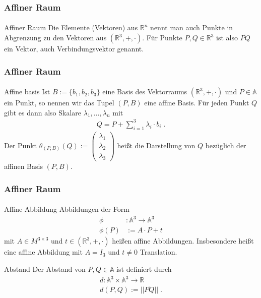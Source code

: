 \documentclass{beamer}
\begin{document}
\begin{frame}
    \frametitle{Affiner Raum}
\framesubtitle{}
\begin{block}{Affiner Raum}
Die Elemente (Vektoren) aus $\mathbb{R}^n$ nennt man auch  Punkte in Abgrenzung zu den Vektoren aus $(\mathbb{R}^3, + , \cdot )$.  
Für Punkte $P,Q \in \mathbb{R}^3$ ist also $\overline{PQ}$ ein Vektor, auch Verbindungsvektor genannt.
\end{block}

\end{frame}


\begin{frame}
    \frametitle{Affiner Raum}
\framesubtitle{}
\begin{block}{Affine basis}
Ist $B:= \{b_1, b_2 , b_3 \}$ eine Basis des Vektorraums  $(\mathbb{R}^3, + , \cdot )$ und $P \in \mathbb{A}$ ein Punkt, so nennen wir das Tupel
$(P, B)$ eine affine Basis. Für jeden Punkt $Q$ gibt es dann also Skalare $\lambda_1,\hdots ,\lambda_n$ mit 
\begin{align*}
Q = P + \sum_{i=1}^{3} \lambda_i \cdot b_i  \; .
\end{align*}
Der Punkt $\theta_{(P,B)}(Q):= \begin{pmatrix}  \lambda_1 \\   \lambda_2 \\  \lambda_3 \end{pmatrix}$ heißt die Darstellung von $Q$ bezüglich der affinen Basis $(P,B)$. 
\end{block}

\end{frame}



\begin{frame}
    \frametitle{Affiner Raum}
\framesubtitle{}
\begin{block}{Affine Abbildung}
Abbildungen der Form
\begin{align*}
\phi &: \mathbb{A}^3 \to \mathbb{A}^3 \\
\phi(P) & := A \cdot P + t
\end{align*} 
mit $A \in M^{3 \times 3}$ und $t \in (\mathbb{R}^3, + , \cdot )$ heißen affine Abbildungen.
Insbesondere heißt eine affine Abbildung mit $A = I_3$ und $t \neq 0$ Translation.
\end{block}
\begin{block}{Abstand}
Der Abstand von  $P,Q \in \mathbb{A}$  ist definiert durch
\begin{align*}
d : \mathbb{A}^3 \times \mathbb{A}^3 \to \mathbb{R} \\
d(P,Q) := || \overline{PQ} || \; .
\end{align*}
\end{block}

\end{frame}
\end{document}
